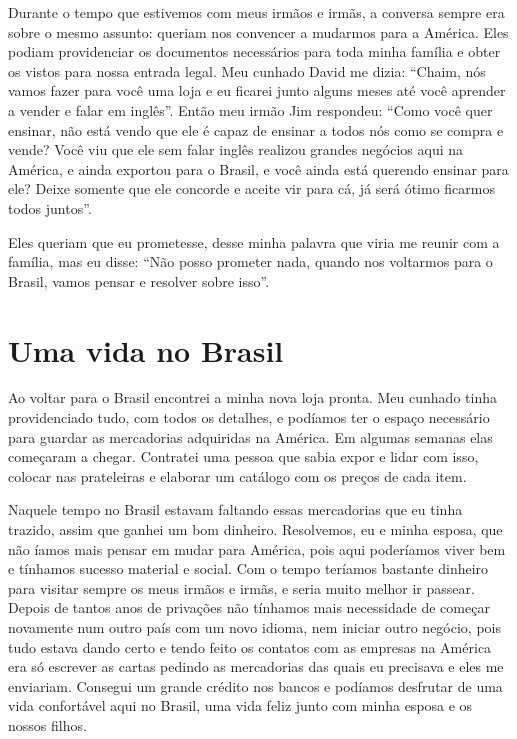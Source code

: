 Durante o tempo que estivemos com meus irmãos e irmãs, a conversa sempre
era sobre o mesmo assunto: queriam nos convencer a mudarmos para a
América. Eles podiam providenciar os documentos necessários para toda
minha família e obter os vistos para nossa entrada legal. Meu cunhado
David me dizia: ``Chaim, nós vamos fazer para você uma loja e eu ficarei
junto alguns meses até você aprender a vender e falar em inglês''. Então
meu irmão Jim respondeu: ``Como você quer ensinar, não está vendo que
ele é capaz de ensinar a todos nós como se compra e vende? Você viu que
ele sem falar inglês realizou grandes negócios aqui na América, e ainda
exportou para o Brasil, e você ainda está querendo ensinar para ele?
Deixe somente que ele concorde e aceite vir para cá, já será ótimo
ficarmos todos juntos''.

Eles queriam que eu prometesse, desse minha palavra que viria me reunir
com a família, mas eu disse: ``Não posso prometer nada, quando nos
voltarmos para o Brasil, vamos pensar e resolver sobre isso''.

\chapter{Uma vida no Brasil}

Ao voltar para o Brasil encontrei a minha nova loja pronta. Meu
cunhado tinha providenciado tudo, com todos os detalhes, e podíamos ter
o espaço necessário para guardar as mercadorias adquiridas na América. 
Em algumas semanas elas começaram a chegar. Contratei
uma pessoa que sabia expor e lidar com isso, colocar nas
prateleiras e elaborar um catálogo com os preços de cada item.

Naquele tempo no Brasil estavam faltando essas mercadorias que eu tinha
trazido, assim que ganhei um bom dinheiro. Resolvemos, eu e minha
esposa, que não íamos mais pensar em mudar para América, pois aqui
poderíamos viver bem e tínhamos sucesso material e social. Com o tempo
teríamos bastante dinheiro para visitar sempre os meus irmãos e irmãs, e
seria muito melhor ir passear. Depois de tantos anos de privações não
tínhamos mais necessidade de começar novamente num outro país com um
novo idioma, nem iniciar outro negócio, pois tudo estava dando certo e
tendo feito os contatos com as empresas na América era só escrever as
cartas pedindo as mercadorias das quais eu precisava e eles me
enviariam. Consegui um grande crédito nos bancos e podíamos desfrutar de
uma vida confortável aqui no Brasil, uma vida feliz junto com minha
esposa e os nossos filhos.

